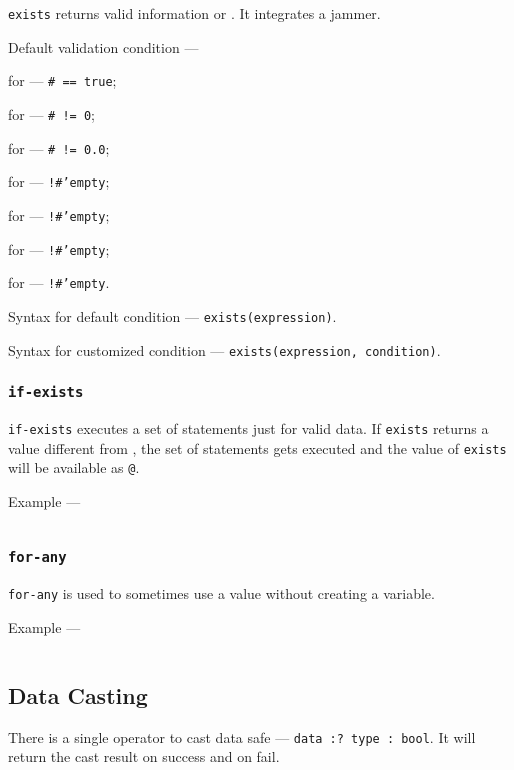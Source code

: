 \texttt{exists} returns valid information or \void. It integrates a jammer. 

Default validation condition —
\begin{icItems}
	\item
	for \bool{} — \texttt{# == true};
	\item
	for \integer{} — \texttt{# != 0};
	\item
	for \double{} — \texttt{# != 0.0};
	\item
	for \str{} — \texttt{!#'empty};
	\item
	for \listtype{} — \texttt{!#'empty};
	\item
	for \set{} — \texttt{!#'empty};
	\item
	for \element{} — \texttt{!#'empty}.
\end{icItems}

Syntax for default condition —
\texttt{exists(expression)}.

Syntax for customized condition —
\texttt{exists(expression, condition)}.

\subsubsection{\texttt{if-exists}}

\texttt{if-exists} executes a set of statements just for valid data. If \texttt{exists} returns a value different from \void, the set of statements gets executed and the value of \texttt{exists} will be available as \texttt{@}.

Example —
\inputminted[linenos]{icl}{../sources/ifexistsex.icL}

\subsubsection{\texttt{for-any}}

\texttt{for-any} is used to sometimes use a value without creating a variable.

Example —
\inputminted[linenos]{icl}{../sources/foranyex.icL}

\subsection{Data Casting}

There is a single operator to cast data safe — \texttt{data :? type : bool}. It will return the cast result on success and \void{} on fail.

